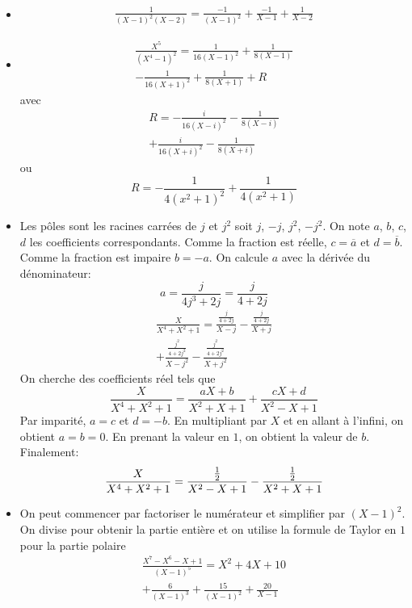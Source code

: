 \begin{itemize}
 \item 
\begin{multline*}
 \frac{1}{(X-1)^{2}(X-2)}
=\frac{-1}{(X-1)^2}+\frac{-1}{X-1}+\frac{1}{X-2}
\end{multline*}

 \item 
\begin{multline*}
\frac{X^{5}}{(X^{4}-1)^{2}} 
= \frac{1}{16(X-1)^2} + \frac{1}{8(X-1)}\\
-\frac{1}{16(X+1)^2} + \frac{1}{8(X+1)} + R
\end{multline*}
avec
\begin{multline*}
 R = -\frac{i}{16(X-i)^2}-\frac{1}{8(X-i)} \\
 +\frac{i}{16(X+i)^2}-\frac{1}{8(X+i)}
\end{multline*}
ou
\begin{displaymath}
 R=-\frac{1}{4(x^2+1)^2} + \frac{1}{4(x^2+1)}
\end{displaymath}

 \item Les pôles sont les racines carrées de $j$ et $j^2$ soit $j$, $-j$, $j^2$, $-j^2$. On note $a$, $b$, $c$, $d$ les coefficients correspondants. Comme la fraction est réelle, $c=\overline{a}$ et $d=\overline{b}$. Comme la fraction est impaire $b=-a$. On calcule $a$ avec la dérivée du dénominateur:
\begin{displaymath}
 a = \frac{j}{4j^3+2j}=\frac{j}{4+2j}
\end{displaymath}
\begin{multline*}
 \frac{X}{X^{4}+X^{2}+1}= \frac{\frac{j}{4+2j}}{X-j}-\frac{\frac{j}{4+2j}}{X+j}\\
 +\frac{\frac{j^2}{4+2j^2}}{X-j^2}-\frac{\frac{j^2}{4+2j^2}}{X+j^2}
\end{multline*}
On cherche des coefficients réel tels que
\begin{displaymath}
 \frac{X}{X^{4}+X^{2}+1}=
\frac{aX+b}{X^2+X+1} + \frac{cX+d}{X^2-X+1}
\end{displaymath}
Par imparité, $a=c$ et $d=-b$. En multipliant par $X$ et en allant à l'infini, on obtient $a=b=0$. En prenant la valeur en $1$, on obtient la valeur de $b$. Finalement:
\begin{displaymath}
 \frac{X}{X^{4}+X^{2}+1}=\\
\frac{\frac{1}{2}}{X^2-X+1} - \frac{\frac{1}{2}}{X^2+X+1}
\end{displaymath}

 \item On peut commencer par factoriser le numérateur et simplifier par $(X-1)^2$. On divise pour obtenir la partie entière et on utilise la formule de Taylor en $1$ pour la partie polaire
\begin{multline*}
 \frac{X^{7}-X^{6}-X+1}{(X-1)^{5}}
= X^2+4X+10 \\
+\frac{6}{(X-1)^3}+\frac{15}{(X-1)^2}+\frac{20}{X-1}
\end{multline*}


\end{itemize}
